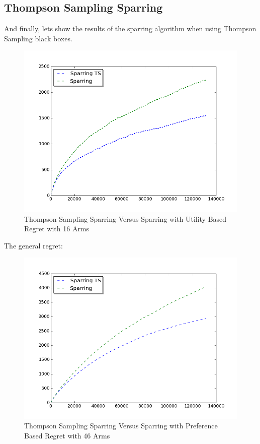 \documentclass{llncs}
\begin{document}
\subsection{Thompson Sampling Sparring}
And finally, lets show the results of  the sparring algorithm when using Thompson Sampling black boxes.

\begin{figure}[h!]
  \centering
     \includegraphics[scale=0.4]{figures/TS_sparring_sparring_MQ2007_16arms.png} 
  \caption{Thompson Sampling Sparring Versus Sparring with Utility Based Regret with 16 Arms}
\end{figure}

The general regret:
\begin{figure}[h!]
  \centering
     \includegraphics[scale=0.4]{figures/TS_sparring_sparring_MQ2007_general.png} 
  \caption{Thompson Sampling Sparring Versus Sparring with Preference Based Regret with 46 Arms}
\end{figure}
\end{document}
